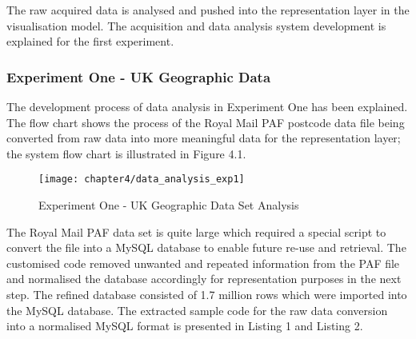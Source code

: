 The raw acquired data is analysed and pushed into the representation layer in the visualisation model. The acquisition and data analysis system development is explained for the first experiment.

\subsubsection{Experiment One - UK Geographic Data}

The development process of data analysis in Experiment One has been explained. The flow chart shows the process of the Royal Mail PAF postcode data file being converted from raw data into more meaningful data for the representation layer; the system flow chart is illustrated in Figure 4.1.

\begin{figure}
\centering
\texttt{[image: chapter4/data\_analysis\_exp1]}
\caption{Experiment One - UK Geographic Data Set Analysis}
\end{figure}

The Royal Mail PAF data set is quite large which required a special script to convert the file into a MySQL database  to enable future re-use and retrieval. The customised code  removed unwanted and repeated information from the PAF file and normalised the database accordingly for representation purposes in the next step. The refined database consisted of 1.7 million rows which were imported into the MySQL database. The extracted sample code for the raw data conversion into a normalised MySQL format is presented in Listing 1 and Listing 2.


